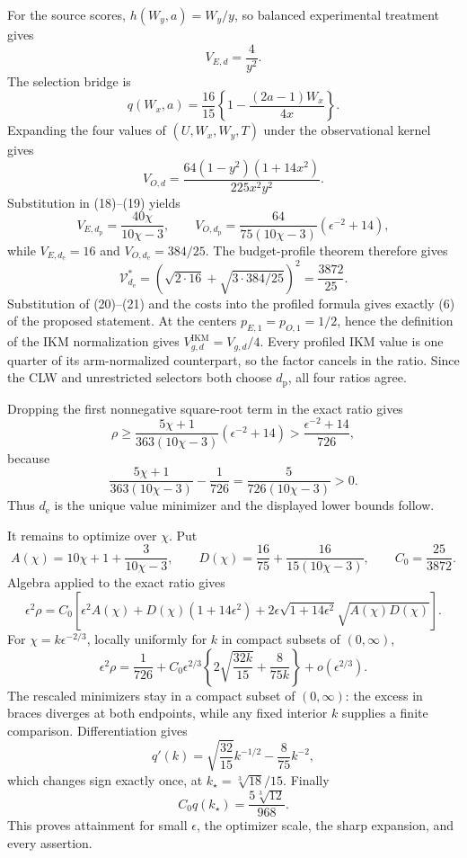 For the source scores, \(h(W_y,a)=W_y/y\), so balanced experimental treatment gives
\[
 V_{E,d}=\frac4{y^2}.                                      \tag{18}
\]
The selection bridge is
\[
 q(W_x,a)=\frac{16}{15}\left\{1-\frac{(2a-1)W_x}{4x}\right\}.
\]
Expanding the four values of \((U,W_x,W_y,T)\) under the observational kernel gives
\[
 V_{O,d}=\frac{64(1-y^2)(1+14x^2)}{225x^2y^2}.             \tag{19}
\]
Substitution in (18)--(19) yields
\[
 V_{E,d_{\mathrm p}}=\frac{40\chi}{10\chi-3},
 \qquad
 V_{O,d_{\mathrm p}}
 =\frac{64}{75(10\chi-3)}(\epsilon^{-2}+14),              \tag{20}
\]
while \(V_{E,d_{\mathrm e}}=16\) and \(V_{O,d_{\mathrm e}}=384/25\).  The budget-profile theorem therefore gives
\[
 \mathcal V_{d_{\mathrm e}}^*
 =\left(\sqrt{2\cdot16}+\sqrt{3\cdot384/25}\right)^2
 =\frac{3872}{25}.                                         \tag{21}
\]
Substitution of (20)--(21) and the costs into the profiled formula gives exactly (6) of the proposed statement.  At the centers \(p_{E,1}=p_{O,1}=1/2\), hence the definition of the IKM normalization gives \(V_{g,d}^{\mathrm{IKM}}=V_{g,d}/4\).  Every profiled IKM value is one quarter of its arm-normalized counterpart, so the factor cancels in the ratio.  Since the CLW and unrestricted selectors both choose \(d_{\mathrm p}\), all four ratios agree.

Dropping the first nonnegative square-root term in the exact ratio gives
\[
 \rho\ge
 \frac{5\chi+1}{363(10\chi-3)}(\epsilon^{-2}+14)
 >\frac{\epsilon^{-2}+14}{726},                            \tag{22}
\]
because
\[
 \frac{5\chi+1}{363(10\chi-3)}-\frac1{726}
 =\frac5{726(10\chi-3)}>0.                                \tag{23}
\]
Thus \(d_{\mathrm e}\) is the unique value minimizer and the displayed lower bounds follow.

It remains to optimize over \(\chi\).  Put
\[
 A(\chi)=10\chi+1+\frac3{10\chi-3},
 \qquad
 D(\chi)=\frac{16}{75}+\frac{16}{15(10\chi-3)},
 \qquad C_0=\frac{25}{3872}.
\]
Algebra applied to the exact ratio gives
\[
 \epsilon^2\rho
 =C_0\left[\epsilon^2A(\chi)+D(\chi)(1+14\epsilon^2)
 +2\epsilon\sqrt{1+14\epsilon^2}\sqrt{A(\chi)D(\chi)}\right]. \tag{24}
\]
For \(\chi=k\epsilon^{-2/3}\), locally uniformly for \(k\) in compact subsets of \((0,\infty)\),
\[
 \epsilon^2\rho
 =\frac1{726}+C_0\epsilon^{2/3}
 \left\{2\sqrt{\frac{32k}{15}}+\frac8{75k}\right\}
 +o(\epsilon^{2/3}).                                      \tag{25}
\]
The rescaled minimizers stay in a compact subset of \((0,\infty)\): the excess in braces diverges at both endpoints, while any fixed interior \(k\) supplies a finite comparison.  Differentiation gives
\[
 q'(k)=\sqrt{\frac{32}{15}}k^{-1/2}-\frac8{75}k^{-2},
\]
which changes sign exactly once, at \(k_\star=\sqrt[3]{18}/15\).  Finally
\[
 C_0q(k_\star)=\frac{5\sqrt[3]{12}}{968}.
\]
This proves attainment for small \(\epsilon\), the optimizer scale, the sharp expansion, and every assertion.